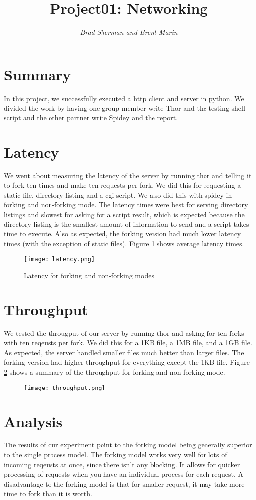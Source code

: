 \documentclass{article}
\title{{\bf Project01: Networking}}
\author{{\it Brad Sherman and Brent Marin}}
\begin{document}
\maketitle

\section*{Summary}
In this project, we successfully executed a http client and server in python. We divided the work by having one group member write Thor and the testing shell script and the other partner write Spidey and the report. 

\section*{Latency}
We went about measuring the latency of the server by running thor and telling it to fork ten times and make ten requests per fork. We did this for requesting a static file, directory listing and a cgi script. We also did this with spidey in forking and non-forking mode. The latency times were best for serving directory listings and slowest for asking for a script result, which is expected because the directory listing is the smallest amount of information to send and a script takes time to execute. Also as expected, the forking version had much lower latency times (with the exception of static files). Figure \ref{fig:latency} shows average latency times.
\begin{figure}[h!]
	\texttt{[image: latency.png]}
\caption{Latency for forking and non-forking modes}
\label{fig:latency}
\end{figure}

\section*{Throughput}
We tested the througput of our server by running thor and asking for ten forks with ten reqeusts per fork. We did this for a 1KB file, a 1MB file, and a 1GB file. As expected, the server handled smaller files much better than larger files. The forking version had higher throughput for everything except the 1KB file. Figure \ref{fig:throughput} shows a summary of the throughput for forking and non-forking mode. 
\begin{figure}[h!]
	\texttt{[image: throughput.png]}
\label{fig:throughput}
\end{figure}

\section*{Analysis}
The results of our experiment point to the forking model being generally superior to the single process model. The forking model works very well for lots of incoming reqeusts at once, since there isn't any blocking. It allows for quicker processing of requests when you have an individual process for each request. A disadvantage to the forking model is that for smaller request, it may take more time to fork than it is worth.
\end{document}
